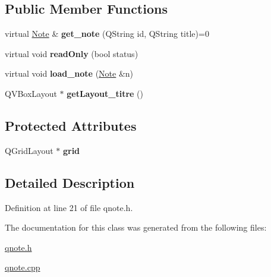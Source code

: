 \subsection*{Public Member Functions}
\begin{DoxyCompactItemize}
\item 
\mbox{\label{class_q_note_a9938dcbd69ea0f0cbc12a8faa2a38576}} 
virtual \hyperlink{class_note}{Note} \& {\bfseries get\+\_\+note} (Q\+String id, Q\+String title)=0
\item 
\mbox{\label{class_q_note_ae6fb14b839acc1979b145a892d6a0a92}} 
virtual void {\bfseries read\+Only} (bool status)
\item 
\mbox{\label{class_q_note_adca0a8f2851fbb1c3843ca4fe7957c11}} 
virtual void {\bfseries load\+\_\+note} (\hyperlink{class_note}{Note} \&n)
\item 
\mbox{\label{class_q_note_aa7e7772b41fe2443cf1225bf1937a4ca}} 
Q\+V\+Box\+Layout $\ast$ {\bfseries get\+Layout\+\_\+titre} ()
\end{DoxyCompactItemize}
\subsection*{Protected Attributes}
\begin{DoxyCompactItemize}
\item 
\mbox{\label{class_q_note_a126c0984d4769bd7a565e1303eac3184}} 
Q\+Grid\+Layout $\ast$ {\bfseries grid}
\end{DoxyCompactItemize}


\subsection{Detailed Description}


Definition at line 21 of file qnote.\+h.



The documentation for this class was generated from the following files\+:\begin{DoxyCompactItemize}
\item 
\hyperlink{qnote_8h}{qnote.\+h}\item 
\hyperlink{qnote_8cpp}{qnote.\+cpp}\end{DoxyCompactItemize}
